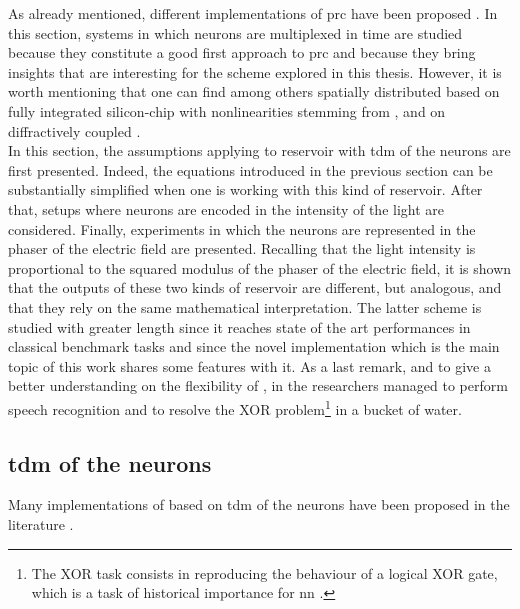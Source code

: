 \label{prc}

As already mentioned, different implementations of \gls{prc} have been proposed \cite{VanderSande2017}. In this section, systems in which neurons are multiplexed in time are studied because they constitute a good first approach to \gls{prc} and because they bring insights that are interesting for the scheme explored in this thesis. However, it is worth mentioning that one can find among others spatially distributed \rcer based on fully integrated silicon-chip with nonlinearities stemming from  \cite{Vandoorne2014}, and on diffractively coupled  \cite{Brunner2015}. \\

In this section, the assumptions applying to reservoir with \gls{tdm} of the neurons are first presented. Indeed, the equations introduced in the previous section can be substantially simplified when one is working with this kind of reservoir. After that, setups where neurons are encoded in the intensity of the light are considered. Finally, experiments in which the neurons are represented in the phaser of the electric field are presented. Recalling that the light intensity is proportional to the squared modulus of the phaser of the electric field, it is shown that the outputs of these two kinds of reservoir are different, but analogous, and that they rely on the same mathematical interpretation. The latter scheme is studied with greater length since it reaches state of the art performances in classical benchmark tasks and since the novel implementation which is the main topic of this work shares some features with it. As a last remark, and to give a better understanding on the flexibility of \rcer, in \cite{Fernando2003} the researchers managed to perform speech recognition and to resolve the XOR problem\footnote{The XOR task consists in reproducing the behaviour of a logical XOR gate, which is a task of historical importance for \gls{nn} \cite{minsky1969perceptrons}.} in a bucket of water.\\


\subsection{\acrlong{tdm} of the neurons}

 Many implementations of \rcer based on \gls{tdm} of the neurons have been proposed in the literature \cite{Paquot2012, Antonik2017, Duport2016, Dejonckheere2014, Vandoorne2008, Vinckier2015}.

